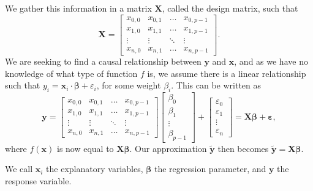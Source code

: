 \documentclass{article}
\begin{document}
We gather this information in a matrix $\textbf{X}$, called the design matrix, such that
\begin{equation*}
    \textbf{X} =
    \begin{bmatrix}
        x_{0,0} & x_{0,1} & \ldots & x_{0, p-1} \\
        x_{1,0} & x_{1,1} & \ldots & x_{1, p-1} \\
        \vdots & \vdots & \ddots & \vdots \\
        x_{n,0} & x_{n,1} & \ldots & x_{n, p-1}
    \end{bmatrix}.
\end{equation*}
We are seeking to find a causal relationship between $\boldsymbol{y}$ and $\boldsymbol{x}$, and as we have no knowledge of what type of function $f$ is, we assume there is a linear relationship such that $y_i = \boldsymbol{x}_i \cdot \boldsymbol{\beta} + \varepsilon_i$, for some weight $\beta_i$. This can be written as
\begin{equation*}
    \boldsymbol{y} = \begin{bmatrix}
        x_{0,0} & x_{0,1} & \ldots & x_{0, p-1} \\
        x_{1,0} & x_{1,1} & \ldots & x_{1, p-1} \\
        \vdots & \vdots & \ddots & \vdots \\
        x_{n,0} & x_{n,1} & \ldots & x_{n, p-1}
    \end{bmatrix}
    \begin{bmatrix}
        \beta_0 \\ \beta_1 \\ \vdots \\ \beta_{p-1}
    \end{bmatrix}
    +
    \begin{bmatrix}
        \varepsilon_0 \\ \varepsilon_1 \\ \vdots \\ \varepsilon_{n}
    \end{bmatrix}
    = \textbf{X} \boldsymbol{\beta} + \boldsymbol{\varepsilon},
\end{equation*}
where $f(\boldsymbol{x})$ is now equal to $\textbf{X} \boldsymbol{\beta}$. Our approximation $\boldsymbol{\tilde{y}}$ then becomes $\boldsymbol{\tilde{y}} = \textbf{X} \boldsymbol{\beta}$.

We call $\boldsymbol{x}_i$ the explanatory variables, $\boldsymbol{\beta}$ the regression parameter, and $\boldsymbol{y}$ the response variable.
\end{document}
